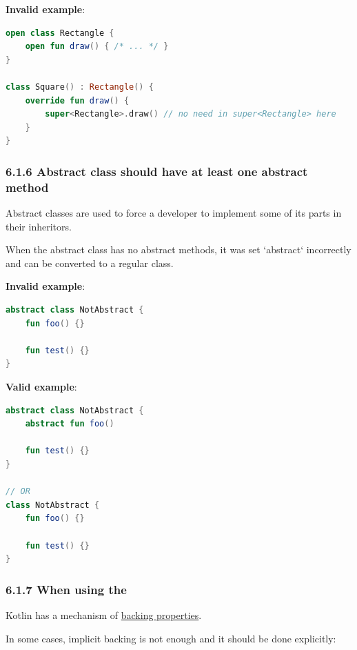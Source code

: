 {{{{\textbf{Invalid example}:

\begin{lstlisting}[language=Kotlin]
open class Rectangle {
    open fun draw() { /* ... */ }
}

class Square() : Rectangle() {
    override fun draw() {
        super<Rectangle>.draw() // no need in super<Rectangle> here
    }
}
\end{lstlisting}


\subsubsection*{\textbf{6.1.6 Abstract class should have at least one abstract method}}
\leavevmode\newline

Abstract classes are used to force a developer to implement some of its parts in their inheritors.

When the abstract class has no abstract methods, it was set `abstract` incorrectly and can be converted to a regular class.



\textbf{Invalid example}:

\begin{lstlisting}[language=Kotlin]
abstract class NotAbstract {
    fun foo() {}
    
    fun test() {}
}
\end{lstlisting}


\textbf{Valid example}:

\begin{lstlisting}[language=Kotlin]
abstract class NotAbstract {
    abstract fun foo()
    
    fun test() {}
}

// OR
class NotAbstract {
    fun foo() {}
    
    fun test() {}
}
\end{lstlisting}




\subsubsection*{\textbf{6.1.7 When using the}}
\leavevmode\newline

Kotlin has a mechanism of \href{https://kotlinlang.org/docs/reference/properties.html#backing-properties}{backing properties}.

In some cases, implicit backing is not enough and it should be done explicitly:

}}}}
